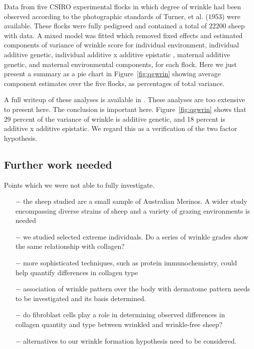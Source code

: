 \documentclass[]{interact}
\theoremstyle{plain}%
\theoremstyle{definition}
\theoremstyle{remark}
\begin{document}
Data from five CSIRO experimental flocks in which degree of wrinkle had been observed according to the photographic standards of Turner, et al. (1953) were available. These flocks were fully pedigreed and contained a total of 22200 sheep with data. A mixed model was fitted which removed fixed effects and estimated components of variance of wrinkle score  for individual environment, individual additive genetic, individual additive x additive epistatic , maternal additive genetic, and maternal environmental components, for each flock.  Here we just present a summary as a pie chart in Figure~\ref{fig:qgwrin} showing average component estimates over the five flocks, as percentages of total variance. 

A full writeup of these analyses is available in \citep{jackson-2018}. These analyses are too extensive to present here. The conclusion is important here. Figure~\ref{fig:qgwrin} shows that 29 percent of the variance of wrinkle is additive genetic, and 18 percent is additive x additive epistatic. We regard this as a verification of the two factor hypothesis.


\subsection{Further work needed}
Points which we were not able to fully investigate. 
\small
\begin{itemize}
\item[$-$] the sheep studied are a small sample of Australian Merinos. A wider study encompassing diverse strains of sheep and a variety of grazing environments is needed
\item[$-$] we studied selected extreme individuals.  Do a series of wrinkle grades show the same relationship with collagen? 
\item[$-$] more sophisticated techniques, such as protein immunochemistry, could help quantify differences in collagen type
\item[$-$] association of wrinkle pattern over the body with dermatome pattern needs to be investigated and its basis determined.
\item[$-$] do fibroblast cells play a role in determining observed differences in collagen quantity and type between wrinkled and wrinkle-free sheep?
\item[$-$] alternatives to our wrinkle formation hypothesis need to be considered.
\end{itemize}
\normalsize
\end{document}
